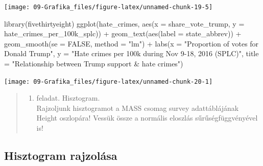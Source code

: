 \documentclass[
]{book}
\newenvironment{Shaded}{\begin{snugshade}}{\end{snugshade}}
\newcommand{\AttributeTok}[1]{\textcolor[rgb]{0.77,0.63,0.00}{#1}}
\newcommand{\ConstantTok}[1]{\textcolor[rgb]{0.00,0.00,0.00}{#1}}
\newcommand{\FunctionTok}[1]{\textcolor[rgb]{0.00,0.00,0.00}{#1}}
\newcommand{\NormalTok}[1]{#1}
\newcommand{\SpecialCharTok}[1]{\textcolor[rgb]{0.00,0.00,0.00}{#1}}
\newcommand{\StringTok}[1]{\textcolor[rgb]{0.31,0.60,0.02}{#1}}
\providecommand{\tightlist}{%
  \setlength{\itemsep}{0pt}\setlength{\parskip}{0pt}}
\begin{document}
\begin{center}\texttt{[image: 09-Grafika\_files/figure-latex/unnamed-chunk-19-5]} \end{center}

\begin{Shaded}
\begin{Highlighting}[]
\FunctionTok{library}\NormalTok{(fivethirtyeight)}
\FunctionTok{ggplot}\NormalTok{(hate\_crimes, }\FunctionTok{aes}\NormalTok{(}\AttributeTok{x =}\NormalTok{ share\_vote\_trump, }\AttributeTok{y =}\NormalTok{ hate\_crimes\_per\_100k\_splc)) }\SpecialCharTok{+}
  \FunctionTok{geom\_text}\NormalTok{(}\FunctionTok{aes}\NormalTok{(}\AttributeTok{label =}\NormalTok{ state\_abbrev)) }\SpecialCharTok{+}
  \FunctionTok{geom\_smooth}\NormalTok{(}\AttributeTok{se =} \ConstantTok{FALSE}\NormalTok{, }\AttributeTok{method =} \StringTok{"lm"}\NormalTok{) }\SpecialCharTok{+}
  \FunctionTok{labs}\NormalTok{(}\AttributeTok{x =} \StringTok{"Proportion of votes for Donald Trump"}\NormalTok{,}
       \AttributeTok{y =} \StringTok{"Hate crimes per 100k during Nov 9{-}18, 2016 (SPLC)"}\NormalTok{,}
       \AttributeTok{title =} \StringTok{"Relationship between Trump support \& hate crimes"}\NormalTok{)}
\end{Highlighting}
\end{Shaded}

\begin{center}\texttt{[image: 09-Grafika\_files/figure-latex/unnamed-chunk-20-1]} \end{center}

\begin{quote}
\begin{enumerate}
\def\labelenumi{\arabic{enumi}.}
\tightlist
\item
  feladat. Hisztogram.\\
  Rajzoljunk hisztogramot a MASS csomag survey adattáblájának Height oszlopára! Vessük össze a normális eloszlás sűrűségfüggvényével is!
\end{enumerate}
\end{quote}

\hypertarget{hisztogram-rajzoluxe1sa}{%
\subsection{Hisztogram rajzolása}\label{hisztogram-rajzoluxe1sa}}
\end{document}

